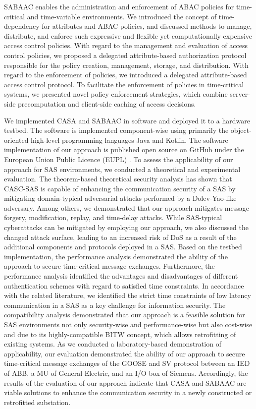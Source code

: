 SABAAC enables the administration and enforcement of ABAC policies for time-critical and time-variable environments.
We introduced the concept of time-dependency for attributes and ABAC policies, and discussed methods to manage, distribute, and enforce such expressive and flexible yet computationally expensive access control policies.
With regard to the management and evaluation of access control policies, we proposed a delegated attribute-based authorization protocol responsible for the policy creation, management, storage, and distribution.
With regard to the enforcement of policies, we introduced a delegated attribute-based access control protocol.
To facilitate the enforcement of policies in time-critical systems, we presented novel policy enforcement strategies, which combine server-side precomputation and client-side caching of access decisions.

We implemented CASA and SABAAC in software and deployed it to a hardware testbed.
The software is implemented component-wise using primarily the object-oriented high-level programming languages Java and Kotlin.
The software implementation of our approach is published open source on GitHub \cite{gitcasc} under the European Union Public Licence (EUPL) \cite{eupl}.
To assess the applicability of our approach for SAS environments, we conducted a theoretical and experimental evaluation.
The theorem-based theoretical security analysis has shown that CASC-SAS is capable of enhancing the communication security of a SAS by mitigating domain-typical adversarial attacks performed by a Dolev-Yao-like adversary.
Among others, we demonstrated that our approach mitigates message forgery, modification, replay, and time-delay attacks.
While SAS-typical cyberattacks can be mitigated by employing our approach, we also discussed the changed attack surface, leading to an increased risk of DoS as a result of the additional components and protocols deployed in a SAS.
Based on the testbed implementation, the performance analysis demonstrated the ability of the approach to secure time-critical message exchanges.
Furthermore, the performance analysis identified the advantages and disadvantages of different authentication schemes with regard to satisfied time constraints.
In accordance with the related literature, we identified the strict time constraints of low latency communication in a SAS as a key challenge for information security.
The compatibility analysis demonstrated that our approach is a feasible solution for SAS environments not only security-wise and performance-wise but also cost-wise and due to its highly-compatible BITW concept, which allows retrofitting of existing systems.
As we conducted a laboratory-based demonstration of applicability, our evaluation demonstrated the ability of our approach to secure time-critical message exchanges of the GOOSE and SV protocol between an IED of ABB, a MU of General Electric, and an I/O box of Siemens.
Accordingly, the results of the evaluation of our approach indicate that CASA and SABAAC are viable solutions to enhance the communication security in a newly constructed or retrofitted substation.
